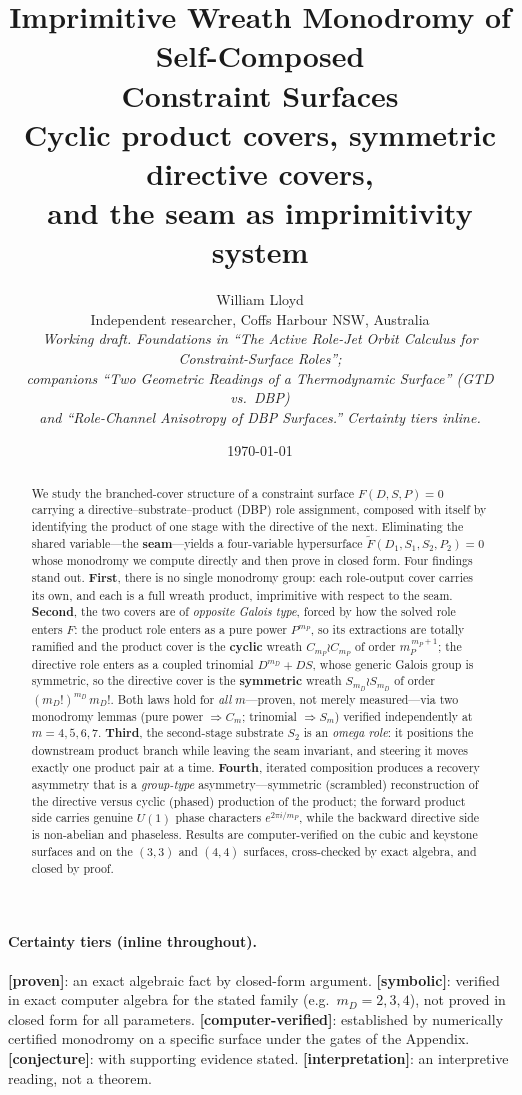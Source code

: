 \documentclass[11pt]{article}
\title{\textbf{Imprimitive Wreath Monodromy of Self-Composed\\ Constraint Surfaces}\\[4pt]
\large Cyclic product covers, symmetric directive covers,\\ and the seam as imprimitivity system}
\author{William Lloyd\\ \small Independent researcher, Coffs Harbour NSW, Australia\\[2pt]
\small\emph{Working draft. Foundations in ``The Active Role-Jet Orbit Calculus for Constraint-Surface Roles'';}\\
\small\emph{companions ``Two Geometric Readings of a Thermodynamic Surface'' (GTD vs.\ DBP)}\\
\small\emph{and ``Role-Channel Anisotropy of DBP Surfaces.'' Certainty tiers inline.}}
\date{\today}
\theoremstyle{plain}
\theoremstyle{definition}
\theoremstyle{remark}
\begin{document}
\maketitle

\begin{abstract}
We study the branched-cover structure of a constraint surface $F(D,S,P)=0$ carrying a
directive--substrate--product (DBP) role assignment, composed with itself by identifying the product
of one stage with the directive of the next. Eliminating the shared variable---the \textbf{seam}---yields
a four-variable hypersurface $\widetilde F(D_1,S_1,S_2,P_2)=0$ whose monodromy we compute directly and
then prove in closed form. Four findings stand out. \textbf{First}, there is no single monodromy group:
each role-output cover carries its own, and each is a full wreath product, imprimitive with respect to
the seam. \textbf{Second}, the two covers are of \emph{opposite Galois type}, forced by how the solved
role enters $F$: the product role enters as a pure power $P^{m_P}$, so its extractions are totally
ramified and the product cover is the \textbf{cyclic} wreath $C_{m_P}\wr C_{m_P}$ of order
$m_P^{\,m_P+1}$; the directive role enters as a coupled trinomial $D^{m_D}+DS$, whose generic Galois
group is symmetric, so the directive cover is the \textbf{symmetric} wreath $S_{m_D}\wr S_{m_D}$ of
order $(m_D!)^{m_D}\,m_D!$. Both laws hold for \emph{all} $m$---proven, not merely measured---via two
monodromy lemmas (pure power $\Rightarrow C_m$; trinomial $\Rightarrow S_m$) verified independently at
$m=4,5,6,7$. \textbf{Third}, the second-stage substrate $S_2$ is an \emph{omega role}: it positions the
downstream product branch while leaving the seam invariant, and steering it moves exactly one product
pair at a time. \textbf{Fourth}, iterated composition produces a recovery asymmetry that is a
\emph{group-type} asymmetry---symmetric (scrambled) reconstruction of the directive versus cyclic
(phased) production of the product; the forward product side carries genuine $U(1)$ phase characters
$e^{2\pi i/m_P}$, while the backward directive side is non-abelian and phaseless. Results are
computer-verified on the cubic and keystone surfaces and on the $(3,3)$ and $(4,4)$ surfaces,
cross-checked by exact algebra, and closed by proof.
\end{abstract}

\paragraph{Certainty tiers (inline throughout).}
\textbf{[proven]}: an exact algebraic fact by closed-form argument.
\textbf{[symbolic]}: verified in exact computer algebra for the stated family (e.g.\ $m_D=2,3,4$), not
proved in closed form for all parameters.
\textbf{[computer-verified]}: established by numerically certified monodromy on a specific surface under
the gates of the Appendix.
\textbf{[conjecture]}: with supporting evidence stated.
\textbf{[interpretation]}: an interpretive reading, not a theorem.
\end{document}

